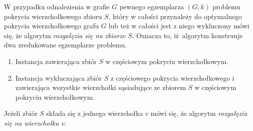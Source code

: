 {\begin{bproof}
  \end{bproof}
  \begin{definition}
    W przypadku odnalezienia w grafie $G$ pewnego egzemplarza $(G, k)$ problemu pokrycia wierzchołkowego zbioru $S$, który w całości przynależy do optymalnego pokrycia wierzchołkowego grafu $G$ lub też w całości jest z niego wykluczony mówi się, że algorytm \emph{rozgałęzia się na zbiorze $S$}.
    Oznacza to, iż algorytm konstruuje dwa zredukowane egzemplarze problemu.
    \begin{enumerate}
      \item Instancja zawierająca zbiór $S$ w częściowym pokryciu wierzchołkowym.
      \item Instancja wykluczająca zbiór $S$ z częściowego pokrycia wierzchołkowego i zawierająca wszystkie wierzchołki sąsiadujące ze zbiorem $S$ w częściowym pokryciu wierzchołkowym.
    \end{enumerate}
    Jeżeli zbiór $S$ składa się z jednego wierzchołka $v$ mówi się, że algorytm \emph{rozgałęzia się na wierzchołku $v$}.
  \end{definition}
}
